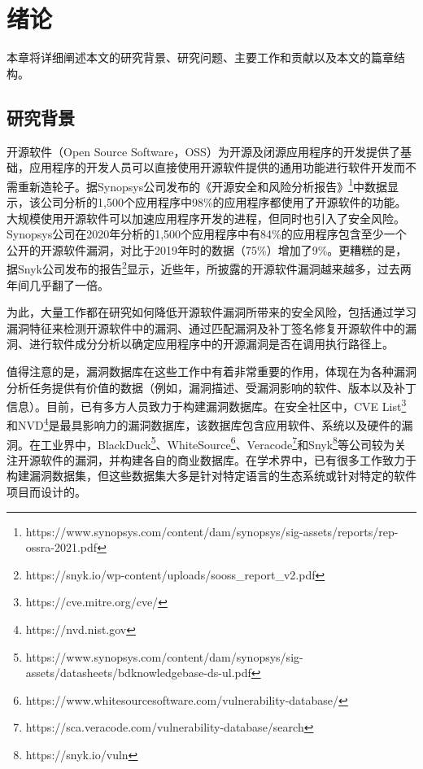 \chapter{绪论}

本章将详细阐述本文的研究背景、研究问题、主要工作和贡献以及本文的篇章结构。

\section{研究背景}

开源软件（Open Source Software，OSS）为开源及闭源应用程序的开发提供了基础，应用程序的开发人员可以直接使用开源软件提供的通用功能进行软件开发而不需重新造轮子。据Synopsys公司发布的《开源安全和风险分析报告》\footnote{https://www.synopsys.com/content/dam/synopsys/sig-assets/reports/rep-ossra-2021.pdf}中数据显示，该公司分析的1,500个应用程序中98\%的应用程序都使用了开源软件的功能。大规模使用开源软件可以加速应用程序开发的进程，但同时也引入了安全风险。Synopsys公司在2020年分析的1,500个应用程序中有84\%的应用程序包含至少一个公开的开源软件漏洞，对比于2019年时的数据（75\%）增加了9\%。更糟糕的是，据Snyk公司发布的报告\footnote{https://snyk.io/wp-content/uploads/sooss\_report\_v2.pdf}显示，近些年，所披露的开源软件漏洞越来越多，过去两年间几乎翻了一倍。

为此，大量工作都在研究如何降低开源软件漏洞所带来的安全风险，包括通过学习漏洞特征来检测开源软件中的漏洞\cite{li2016vulpecker,li2018vuldeepecker,zhou2019devign,jimenez2019importance}、通过匹配漏洞及补丁签名\cite{jang2012redebug, kim2017vuddy, xu2020patch, xiao2020mvp, cui2020vuldetector}修复开源软件中的漏洞\cite{mulliner2013patchdroid, duan2019automating, xu2020automatic, machiry2020spider}、进行软件成分分析以确定应用程序中的开源漏洞是否在调用执行路径上\cite{pashchenko2018vulnerable, ponta2020detection, pashchenko2020vuln4real, Wang2020empirical}。

值得注意的是，漏洞数据库在这些工作中有着非常重要的作用，体现在为各种漏洞分析任务提供有价值的数据（例如，漏洞描述、受漏洞影响的软件、版本以及补丁信息）。目前，已有多方人员致力于构建漏洞数据库。在安全社区中，CVE List\footnote{https://cve.mitre.org/cve/}和NVD\footnote{https://nvd.nist.gov}是最具影响力的漏洞数据库，该数据库包含应用软件、系统以及硬件的漏洞。在工业界中，BlackDuck\footnote{https://www.synopsys.com/content/dam/synopsys/sig-assets/datasheets/bdknowledgebase-ds-ul.pdf}、WhiteSource\footnote{https://www.whitesourcesoftware.com/vulnerability-database/}、Veracode\footnote{https://sca.veracode.com/vulnerability-database/search}和Snyk\footnote{https://snyk.io/vuln}等公司较为关注开源软件的漏洞，并构建各自的商业数据库。在学术界中，已有很多工作致力于构建漏洞数据集\cite{ponta2019manually,fan2020ac,jimenez2018enabling,gkortzis2018vulinoss,namrud2019androvul}，但这些数据集大多是针对特定语言的生态系统或针对特定的软件项目而设计的。


